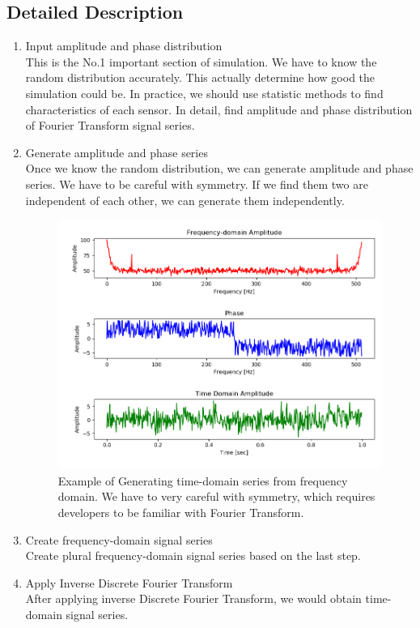 \documentclass[
12pt, %
a4paper %
]{extreport}
\theoremstyle{plain}
\begin{document}
\subsection{Detailed Description}
\begin{enumerate}
\item Input amplitude and phase distribution\\
This is the No.1 important section of simulation. We have to know the random distribution accurately. This actually determine how good the simulation could be. In practice, we should use statistic methods to find characteristics of each sensor. In detail, find amplitude and phase distribution of Fourier Transform signal series. 
\item Generate amplitude and phase series\\
Once we know the random distribution, we can generate amplitude and phase series. We have to be careful with symmetry. If we find them two are independent of each other, we can generate them independently. 
\begin{figure}[ht]
	\centering
	\includegraphics[width=\textwidth]{f2t.png}
	\caption{Example of Generating time-domain series from frequency domain. We have to very careful with symmetry, which requires developers to be familiar with Fourier Transform. }
	\label{fig:f2t}
\end{figure}
\item Create frequency-domain signal series\\
Create plural frequency-domain signal series based on the last step. 
\item Apply Inverse Discrete Fourier Transform\\
After applying inverse Discrete Fourier Transform, we would obtain time-domain signal series. 
\end{enumerate}
\end{document}
